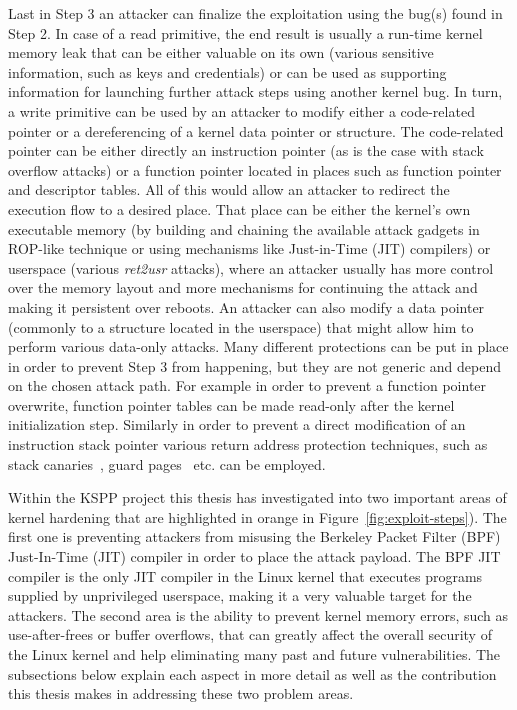 Last in Step 3 an attacker can finalize the exploitation using the bug(s) found in Step 2. In case of a read primitive, the end result is usually a run-time kernel memory leak that can be either valuable on its own (various sensitive information, such as keys and credentials) or can be used as supporting information for launching further attack steps using another kernel bug. In turn, a write primitive can be used by an attacker to modify either a code-related pointer or a dereferencing of a kernel data pointer or structure. The code-related pointer can be either directly an instruction pointer (as is the case with stack overflow attacks) or a function pointer located in places such as function pointer and descriptor tables. All of this would allow an attacker to redirect the execution flow to a desired place. That place can be either the kernel's own executable memory (by building and chaining the available attack gadgets in ROP-like technique or using mechanisms like Just-in-Time (JIT) compilers) or userspace (various \textit{ret2usr} attacks), where an attacker usually has more control over the memory layout and more mechanisms for continuing the attack and making it persistent over reboots. An attacker can also modify a data pointer (commonly to a structure located in the userspace) that might allow him to perform various data-only attacks. Many different protections can be put in place in order to prevent Step 3 from happening, but they are not generic and depend on the chosen attack path. For example in order to prevent a function pointer overwrite, function pointer tables can be made read-only after the kernel initialization step. Similarly in order to prevent a direct modification of an instruction stack pointer various return address protection techniques, such as stack canaries~\cite{edge2014}, guard pages~\cite{kstackoverflow2017} etc. can be employed.    

Within the KSPP project this thesis has investigated into two important areas of kernel hardening that are highlighted in orange in Figure~\ref{fig:exploit-steps}). The first one is preventing attackers from misusing the Berkeley Packet Filter (BPF) Just-In-Time (JIT) compiler in order to place the attack payload. The BPF JIT compiler is the only JIT compiler in the Linux kernel that executes programs supplied by unprivileged userspace, making it a very valuable target for the attackers.  The second area is the ability to prevent kernel memory errors, such as use-after-frees or buffer overflows, that can greatly affect the overall security of the Linux kernel and help eliminating many past and future vulnerabilities. The subsections below explain each aspect in more detail as well as the contribution this thesis makes in addressing these two problem areas.  

